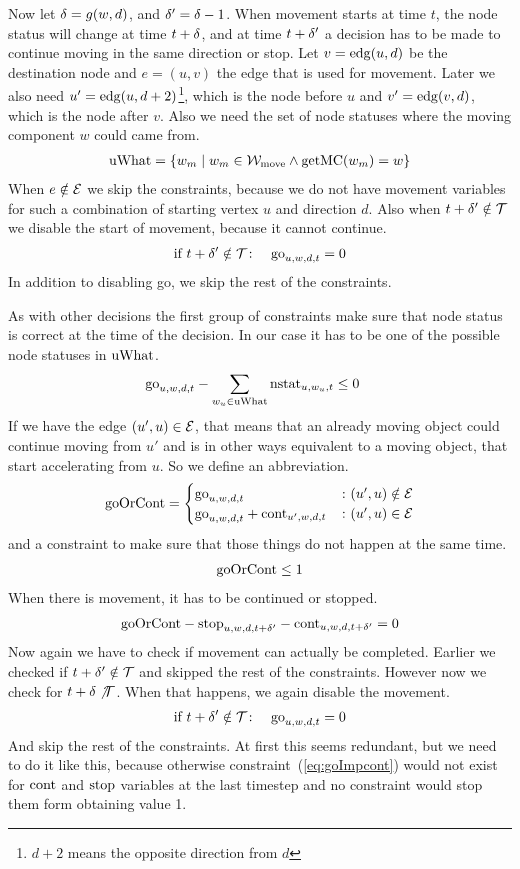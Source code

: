Now let $\delta = g(w,d)$, and $\delta' = \delta-1$. When movement starts at time $t$,
the node status will change at time $t+\delta$, and at time $t+\delta'$ a decision
has to be made to continue moving in the same direction or stop. Let $v =
\mathrm{edg}(u,d)$ be the destination node and $e = (u,v)$ the edge that is used for
movement. Later we also need $u' = \mathrm{edg}(u,d+2)$\footnote{$d+2$ means the
opposite direction from $d$}, which is the node before $u$ and $v' =
\mathrm{edg}(v,d)$, which is the node after $v$. Also we need the set of node statuses
where the moving component $w$ could came from.
\begin{align}
    \mathrm{uWhat} = \{w_m \mid w_m \in \mathcal{W}_\mathrm{move} \wedge \mathrm{getMC}(w_m) = w\}
\end{align}
When $e \notin \mathcal{E}$ we skip the constraints, because we do not have movement
variables for such a combination of starting vertex $u$ and direction $d$. Also
when $t+\delta' \notin \mathcal{T}$ we disable the start of movement, because it cannot
continue.
\begin{align}
    &\text{if}\ t+\delta' \notin \mathcal{T} \colon &\mathrm{go}_{u,w,d,t} = 0
\end{align}
In addition to disabling go, we skip the rest of the constraints.

As with other decisions the first group of constraints make sure that node
status is correct at the time of the decision. In our case it has to be one of
the possible node statuses in $\mathrm{uWhat}$.
\begin{align}
    & \mathrm{go}_{u,w,d,t} - \sum_{w_u \in \mathrm{uWhat}} \mathrm{nstat}_{u,w_u,t} \leq 0
\end{align}
If we have the edge $(u',u) \in \mathcal{E}$, that means that an already moving object
could continue moving from $u'$ and is in other ways equivalent to a moving
object, that start accelerating from $u$. So we define an abbreviation.
\begin{align*}
    \mathrm{goOrCont} = \begin{cases}
        \mathrm{go}_{u,w,d,t} &\colon (u',u) \notin \mathcal{E}\\
        \mathrm{go}_{u,w,d,t} + \mathrm{cont}_{u',w,d,t} &\colon (u',u) \in \mathcal{E}
    \end{cases}
\end{align*}
and a constraint to make sure that those things do not happen at the same time.
\begin{align}
    \mathrm{goOrCont} \leq 1
\end{align}
When there is movement, it has to be continued or stopped.
\begin{align}
    \label{eq:goImpcont}
    \mathrm{goOrCont} - \mathrm{stop}_{u,w,d,t+\delta'} - \mathrm{cont}_{u,w,d,t+\delta'} = 0
\end{align}
Now again we have to check if movement can actually be completed. Earlier we
checked if $t+\delta' \notin \mathcal{T}$ and skipped the rest of the constraints. However
now we check for $t+\delta \not \mathcal{T}$. When that happens, we again disable the
movement.
\begin{align}
    &\text{if}\ t+\delta' \notin \mathcal{T} \colon &\mathrm{go}_{u,w,d,t} = 0
\end{align}
And skip the rest of the constraints. At first this seems redundant, but we
need to do it like this, because otherwise constraint~(\ref{eq:goImpcont}) would
not exist for $\mathrm{cont}$ and $\mathrm{stop}$ variables at the last timestep and no
constraint would stop them form obtaining value 1.


